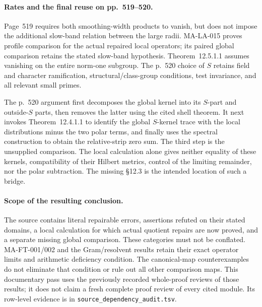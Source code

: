 \paragraph{Rates and the final reuse on pp.~519--520.}
Page~519 requires both smoothing-width products to vanish,
but does not impose the additional slow-band relation between
the large radii.  MA-LA-015 proves profile comparison for the
actual repaired local operators; its paired global comparison
retains the stated slow-band hypothesis.
Theorem~12.5.1.1 assumes vanishing on the entire norm-one
subgroup.  The p.~520 choice of $S$ retains field and character
ramification, structural/class-group conditions, test invariance,
and all relevant small primes.

The p.~520 argument first decomposes the global kernel into
its $S$-part and outside-$S$ parts, then removes the latter
using the cited shell theorem.  It next invokes
Theorem~12.4.1.1 to identify the global $S$-kernel trace with
the local distributions minus the two polar terms, and finally
uses the spectral construction to obtain the relative-strip
zero sum.  The third step is the unsupplied comparison.
The local calculation alone gives neither equality of these
kernels, compatibility of their Hilbert metrics, control of
the limiting remainder, nor the polar subtraction.
The missing \S12.3 is the intended location of such a bridge.

\paragraph{Scope of the resulting conclusion.}
The source contains literal repairable errors, assertions
refuted on their stated domains, a local calculation for which
actual quotient repairs are now proved, and a separate missing
global comparison.  These categories must not be conflated.
MA-FT-001/002 and the Gram/resolvent results retain their exact
operator limits and arithmetic deficiency condition.
The canonical-map counterexamples do not eliminate that
condition or rule out all other comparison maps.
This documentary pass uses the previously recorded whole-proof
reviews of those results; it does not claim a fresh complete
proof review of every cited module.  Its row-level evidence is
in \texttt{source\_dependency\_audit.tsv}.
